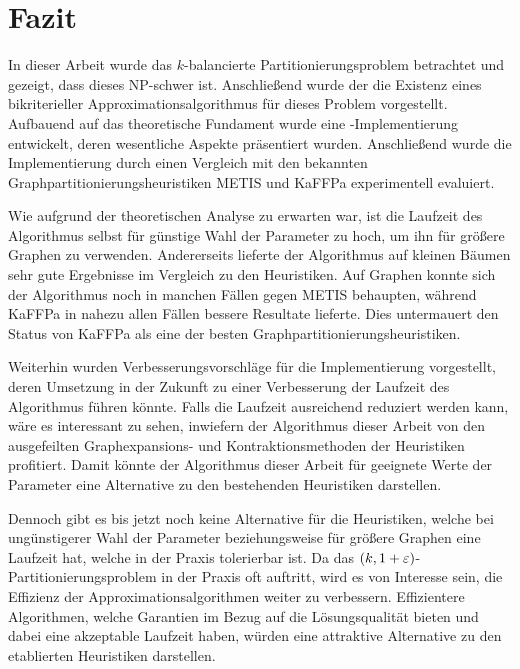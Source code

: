 
\chapter{Fazit}\label{chapter:fazit}
In dieser Arbeit wurde das $k$\hyp balancierte Partitionierungsproblem betrachtet und gezeigt, dass dieses NP-schwer ist.
Anschließend wurde der die Existenz eines bikriterieller Approximationsalgorithmus für dieses Problem vorgestellt.
Aufbauend auf das theoretische Fundament wurde eine \Cpp{}\hyp Implementierung entwickelt, deren wesentliche Aspekte präsentiert wurden.
Anschließend wurde die Implementierung durch einen Vergleich mit den bekannten Graphpartitionierungsheuristiken METIS und KaFFPa experimentell evaluiert.

Wie aufgrund der theoretischen Analyse zu erwarten war, ist die Laufzeit des Algorithmus selbst für günstige Wahl der Parameter zu hoch, um ihn für größere Graphen zu verwenden.
Andererseits lieferte der Algorithmus auf kleinen Bäumen sehr gute Ergebnisse im Vergleich zu den Heuristiken.
Auf Graphen konnte sich der Algorithmus noch in manchen Fällen gegen METIS behaupten, während KaFFPa in nahezu allen Fällen bessere Resultate lieferte.
Dies untermauert den Status von KaFFPa als eine der besten Graphpartitionierungsheuristiken.

Weiterhin wurden Verbesserungsvorschläge für die Implementierung vorgestellt, deren Umsetzung in der Zukunft zu einer Verbesserung der Laufzeit des Algorithmus führen könnte.
Falls die Laufzeit ausreichend reduziert werden kann, wäre es interessant zu sehen, inwiefern der Algorithmus dieser Arbeit von den ausgefeilten Graphexpansions- und Kontraktionsmethoden der Heuristiken profitiert.
Damit könnte der Algorithmus dieser Arbeit für geeignete Werte der Parameter eine Alternative zu den bestehenden Heuristiken darstellen.

Dennoch gibt es bis jetzt noch keine Alternative für die Heuristiken, welche bei ungünstigerer Wahl der Parameter beziehungsweise für größere Graphen eine Laufzeit hat, welche in der Praxis tolerierbar ist.
Da das $(k,1+\varepsilon)$\hyp Partitionierungsproblem in der Praxis oft auftritt, wird es von Interesse sein, die Effizienz der Approximationsalgorithmen weiter zu verbessern.
Effizientere Algorithmen, welche Garantien im Bezug auf die Lösungsqualität bieten und dabei eine akzeptable Laufzeit haben, würden eine attraktive Alternative zu den etablierten Heuristiken darstellen. 
